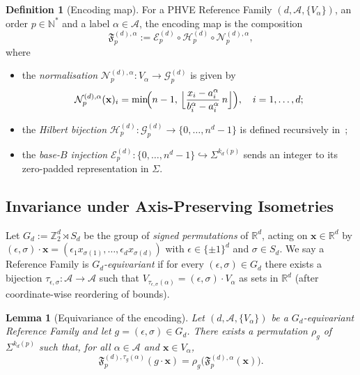 \documentclass[11pt,a4paper]{article}
\theoremstyle{plain}
\newtheorem{lemma}[theorem]{Lemma}
\theoremstyle{definition}
\newtheorem{definition}[theorem]{Definition}
\theoremstyle{remark}
\newcommand{\N}{\mathbb{N}}
\newcommand{\Z}{\mathbb{Z}}
\newcommand{\R}{\mathbb{R}}
\newcommand{\Hil}{\mathcal{H}}
\newcommand{\Enc}{\mathcal{E}}
\newcommand{\Nor}{\mathcal{N}}
\newcommand{\Fc}{\mathfrak{F}}
\newcommand{\Grid}{\mathcal{G}}
\begin{document}
\begin{definition}[Encoding map]\label{def:encoding_map}
For a PHVE Reference Family $(d,\mathcal{A},\{V_\alpha\})$, an order
$p\in\N^*$ and a label $\alpha\in\mathcal{A}$, the encoding map is the
composition
\[
\Fc_p^{(d),\alpha} := \Enc_p^{(d)} \circ \Hil_p^{(d)} \circ \Nor_p^{(d),\alpha},
\]
where
\begin{itemize}[nosep]
\item the \emph{normalisation}
$\Nor_p^{(d),\alpha}: V_\alpha \to \Grid_p^{(d)}$ is given by
\[
\Nor_p^{(d),\alpha}(\mathbf{x})_i = \min\!\Bigl(n-1,\,
\Bigl\lfloor \dfrac{x_i - a_i^\alpha}{b_i^\alpha - a_i^\alpha}\,n
\Bigr\rfloor\Bigr),\quad i=1,\dots,d;
\]
\item the \emph{Hilbert bijection}
$\Hil_p^{(d)}:\Grid_p^{(d)}\to \{0,\dots,n^d-1\}$ is defined recursively
in~;
\item the \emph{base-$B$ injection}
$\Enc_p^{(d)}: \{0,\dots,n^d-1\}\hookrightarrow \Sigma^{k_d(p)}$
sends an integer to its zero-padded representation in $\Sigma$.
\end{itemize}
\end{definition}



\subsection{Invariance under Axis-Preserving Isometries}
\label{sec:framework_invariance}

Let $G_d := \Z_2^d \rtimes S_d$ be the group of \emph{signed permutations}
of $\R^d$, acting on $\mathbf{x}\in\R^d$ by
$(\epsilon,\sigma)\cdot \mathbf{x} = (\epsilon_1 x_{\sigma(1)},\dots,
\epsilon_d x_{\sigma(d)})$
with $\epsilon\in\{\pm 1\}^d$ and $\sigma\in S_d$. We say a Reference
Family is \emph{$G_d$-equivariant} if for every $(\epsilon,\sigma)\in G_d$
there exists a bijection
$\tau_{\epsilon,\sigma}:\mathcal{A}\to\mathcal{A}$ such that
$V_{\tau_{\epsilon,\sigma}(\alpha)}=(\epsilon,\sigma)\cdot V_\alpha$ as
sets in $\R^d$ (after coordinate-wise reordering of bounds).

\begin{lemma}[Equivariance of the encoding]\label{lem:equivariance}
Let $(d,\mathcal{A},\{V_\alpha\})$ be a $G_d$-equivariant Reference
Family and let $g=(\epsilon,\sigma)\in G_d$. There exists a permutation
$\rho_g$ of $\Sigma^{k_d(p)}$ such that, for all $\alpha\in\mathcal{A}$
and $\mathbf{x}\in V_\alpha$,
\[
\Fc_p^{(d),\tau_g(\alpha)}(g\cdot \mathbf{x})
=\rho_g\bigl(\Fc_p^{(d),\alpha}(\mathbf{x})\bigr).
\]
\end{lemma}
\end{document}
